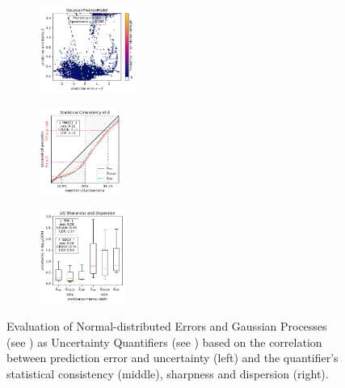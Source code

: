 \begin{figure}[H]
    \begin{subfigure}
    \centering
    \includegraphics[width=0.345\textwidth,valign=t]{uncertainty/figures/uq.gaussianprocessmodel-correlation.pdf}
    \end{subfigure}
    \begin{subfigure}
    \centering
    \includegraphics[width=0.297\textwidth,valign=t]{uncertainty/figures/uq.gaussianprocessmodel-consistency.pdf}
    \end{subfigure}
    \begin{subfigure}
    \centering
    \includegraphics[width=0.308\textwidth,valign=t]{uncertainty/figures/uq.gaussianprocessmodel-sharpness.pdf}
    \end{subfigure}
   
    \vspace{-1em}
    \caption[Evaluation of Normal Errors and Gaussian Processes as Uncertainty Quantifiers]{Evaluation of Normal-distributed Errors and Gaussian Processes (see ) as Uncertainty Quantifiers (see ) based on the correlation between prediction error and uncertainty (left) and the quantifier's statistical consistency (middle), sharpness and dispersion (right).}
    \label{fig:uncertainty-normal-gp}
\end{figure}

